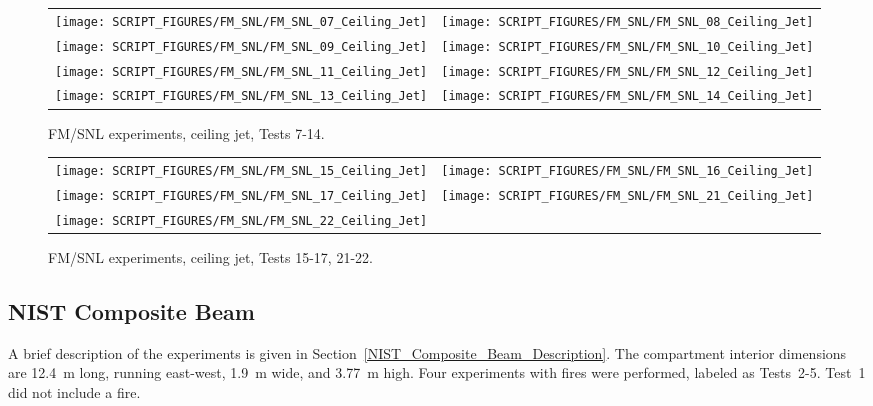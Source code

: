 \newpage

\begin{figure}[p]
\begin{tabular*}{\textwidth}{l@{\extracolsep{\fill}}r}
\texttt{[image: SCRIPT\_FIGURES/FM\_SNL/FM\_SNL\_07\_Ceiling\_Jet]} &
\texttt{[image: SCRIPT\_FIGURES/FM\_SNL/FM\_SNL\_08\_Ceiling\_Jet]} \\
\texttt{[image: SCRIPT\_FIGURES/FM\_SNL/FM\_SNL\_09\_Ceiling\_Jet]} &
\texttt{[image: SCRIPT\_FIGURES/FM\_SNL/FM\_SNL\_10\_Ceiling\_Jet]} \\
\texttt{[image: SCRIPT\_FIGURES/FM\_SNL/FM\_SNL\_11\_Ceiling\_Jet]} &
\texttt{[image: SCRIPT\_FIGURES/FM\_SNL/FM\_SNL\_12\_Ceiling\_Jet]} \\
\texttt{[image: SCRIPT\_FIGURES/FM\_SNL/FM\_SNL\_13\_Ceiling\_Jet]} &
\texttt{[image: SCRIPT\_FIGURES/FM\_SNL/FM\_SNL\_14\_Ceiling\_Jet]} \\
\end{tabular*}
\caption[FM/SNL experiments, ceiling jet, Tests 7-14]
{FM/SNL experiments, ceiling jet, Tests 7-14.}
\label{FM_SNL_Ceiling_Jet_2}
\end{figure}

\begin{figure}[p]
\begin{tabular*}{\textwidth}{l@{\extracolsep{\fill}}r}
\texttt{[image: SCRIPT\_FIGURES/FM\_SNL/FM\_SNL\_15\_Ceiling\_Jet]} &
\texttt{[image: SCRIPT\_FIGURES/FM\_SNL/FM\_SNL\_16\_Ceiling\_Jet]} \\
\texttt{[image: SCRIPT\_FIGURES/FM\_SNL/FM\_SNL\_17\_Ceiling\_Jet]} &
\texttt{[image: SCRIPT\_FIGURES/FM\_SNL/FM\_SNL\_21\_Ceiling\_Jet]} \\
\texttt{[image: SCRIPT\_FIGURES/FM\_SNL/FM\_SNL\_22\_Ceiling\_Jet]} \\
\end{tabular*}
\caption[FM/SNL experiments, ceiling jet, Tests 15-17, 21-22]
{FM/SNL experiments, ceiling jet, Tests 15-17, 21-22.}
\label{FM_SNL_Ceiling_Jet_3}
\end{figure}


\clearpage

\subsection{NIST Composite Beam}

A brief description of the experiments is given in Section~\ref{NIST_Composite_Beam_Description}. The compartment interior dimensions are 12.4~m long, running east-west, 1.9~m wide, and 3.77~m high. Four experiments with fires were performed, labeled as Tests~2-5. Test~1 did not include a fire.

